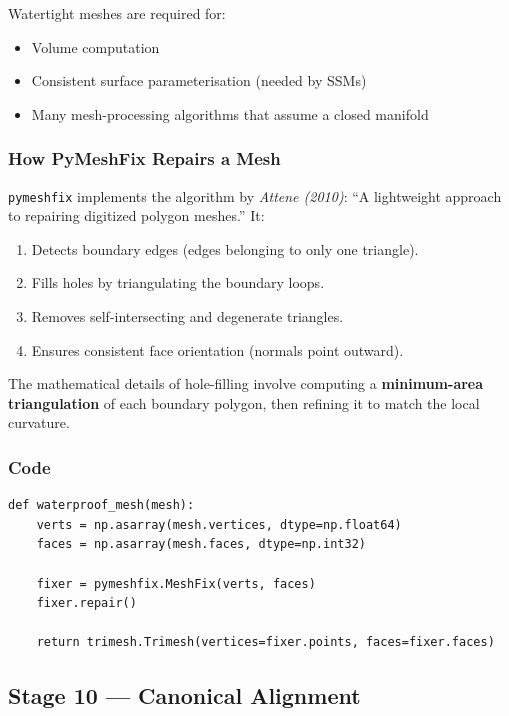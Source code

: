 \documentclass[12pt,a4paper]{article}
\begin{document}
Watertight meshes are required for:
\begin{itemize}
    \item Volume computation
    \item Consistent surface parameterisation (needed by SSMs)
    \item Many mesh-processing algorithms that assume a closed manifold
\end{itemize}

\subsubsection{How PyMeshFix Repairs a Mesh}

\texttt{pymeshfix} implements the algorithm by \emph{Attene (2010)}: ``A
lightweight approach to repairing digitized polygon meshes.''  It:

\begin{enumerate}
    \item Detects boundary edges (edges belonging to only one triangle).
    \item Fills holes by triangulating the boundary loops.
    \item Removes self-intersecting and degenerate triangles.
    \item Ensures consistent face orientation (normals point outward).
\end{enumerate}

The mathematical details of hole-filling involve computing a
\textbf{minimum-area triangulation} of each boundary polygon, then refining
it to match the local curvature.

\subsubsection{Code}

\begin{lstlisting}
def waterproof_mesh(mesh):
    verts = np.asarray(mesh.vertices, dtype=np.float64)
    faces = np.asarray(mesh.faces, dtype=np.int32)

    fixer = pymeshfix.MeshFix(verts, faces)
    fixer.repair()

    return trimesh.Trimesh(vertices=fixer.points, faces=fixer.faces)
\end{lstlisting}


\subsection{Stage 10 — Canonical Alignment}
\label{sec:align}
\end{document}
